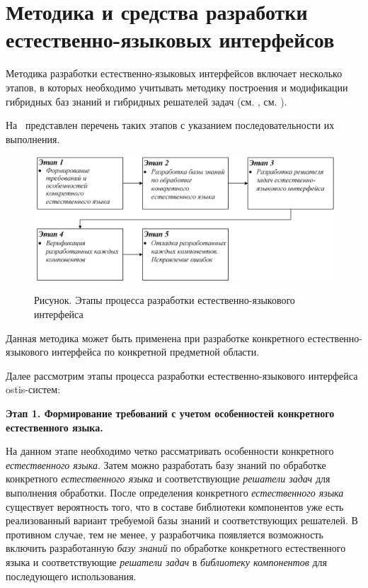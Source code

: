 \section{Методика и средства разработки естественно-языковых интерфейсов}
\label{section_natural_language_interface_development_methods}

Методика разработки естественно-языковых интерфейсов включает несколько этапов, в которых необходимо учитывать методику построения и модификации гибридных баз знаний и гибридных решателей задач (см. , см. ).

На~\textit{} представлен перечень таких этапов с указанием последовательности их выполнения.

\begin{figure}[H]
	\caption{Рисунок. Этапы процесса разработки естественно-языкового интерфейса}
	\includegraphics[scale=0.8,width=1.0\textwidth]{images/part4/chapter_chinese/method}
	\label{fig:method-interface}
\end{figure}

Данная методика может быть применена при разработке конкретного естественно-языкового интерфейса по конкретной предметной области.

Далее рассмотрим этапы процесса разработки естественно-языкового интерфейса ostis-систем:

\textbf{Этап 1. Формирование требований с учетом особенностей конкретного естественного языка.}

На данном этапе необходимо четко рассматривать особенности конкретного \textit{естественного языка}.
Затем можно разработать базу знаний по обработке конкретного \textit{естественного языка} и соответствующие \textit{решатели задач} для выполнения обработки.
После определения конкретного \textit{естественного языка} существует вероятность того, что в составе библиотеки компонентов уже есть реализованный вариант требуемой базы знаний и соответствующих решателей.
В противном случае, тем не менее, у разработчика появляется возможность включить разработанную \textit{базу знаний} по обработке конкретного естественного языка и соответствующие \textit{решатели задач} в \textit{библиотеку компонентов} для последующего использования.

